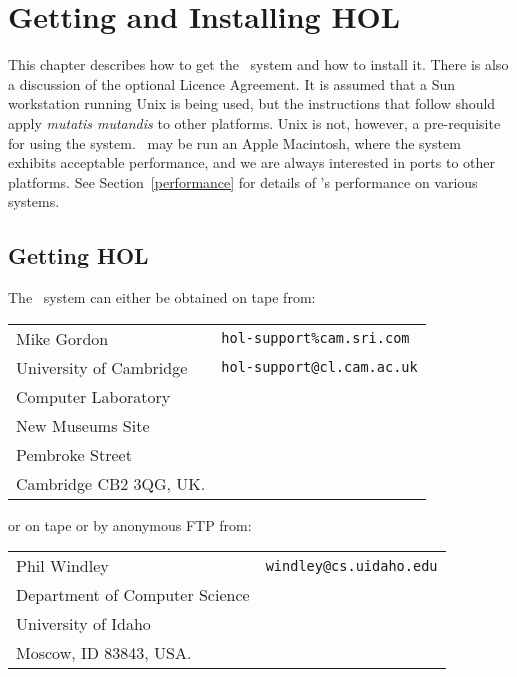 \chapter{Getting and Installing HOL}
\label{install}

This chapter describes how to get the \HOL\ system and how to install it.
There is also a discussion of the optional Licence Agreement.  It is assumed
that a Sun workstation running Unix is being used, but the instructions that
follow should apply {\it mutatis mutandis\/} to other platforms.  Unix is not,
however, a pre-requisite for using the system. \HOL\ may be run an Apple 
Macintosh, where the system 
exhibits acceptable performance, and we are always interested in ports
to other platforms.  See Section~\ref{performance} for details
of \HOL's performance on various systems.

\section{Getting HOL}

The \HOL\ system can either be obtained on tape from:

\vspace*{6pt plus1pt minus1pt}

\begin{tabular}{@{\qquad}l@{\qquad}l}
Mike Gordon & \verb|hol-support%cam.sri.com|\\
University of Cambridge & \verb|hol-support@cl.cam.ac.uk|\\
Computer Laboratory & \mbox{} \\
New Museums Site & \mbox{} \\
Pembroke Street & \mbox {} \\
Cambridge CB2 3QG, UK. & \mbox {}\\
\end{tabular}

\vspace*{6pt plus1pt minus1pt}

\noindent or on tape or by anonymous FTP from:

\vspace*{6pt plus1pt minus1pt}

\begin{tabular}{@{\qquad}l@{\qquad}l}
Phil Windley & \verb|windley@cs.uidaho.edu|\\
Department of Computer Science & \mbox{}\\
University of Idaho & \mbox{} \\
Moscow, ID 83843, USA. & \mbox{} \\
\end{tabular}

